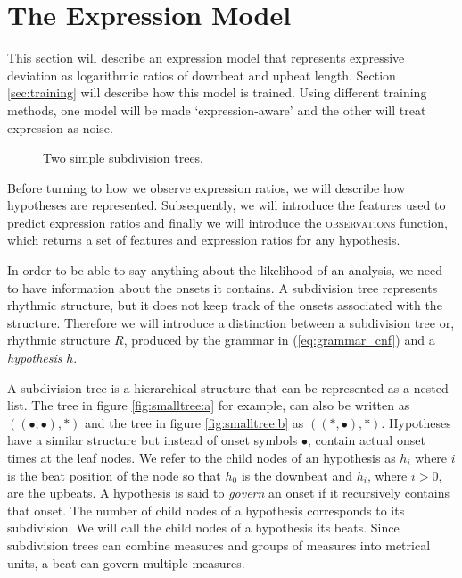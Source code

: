 \section{The Expression Model}
\label{sec:likelihood}

This section will describe an expression model that represents expressive deviation as logarithmic ratios of downbeat and upbeat length. Section \ref{sec:training} will describe how this model is trained. Using different training methods, one model will be made `expression-aware' and the other will treat expression as noise.


\begin{figure}
\centering
{}
\caption{Two simple subdivision trees.}
\label{fig:smalltree}
\end{figure}

Before turning to how we observe expression ratios, we will describe how hypotheses are represented. Subsequently, we will introduce the features used to predict expression ratios and finally we will introduce the \textsc{observations} function, which returns a set of features and expression ratios for any hypothesis.

In order to be able to say anything about the likelihood of an analysis, we need to have information about the onsets it contains. A subdivision tree represents rhythmic structure, but it does not keep track of the onsets associated with the structure. Therefore we will introduce a distinction between a subdivision tree or, rhythmic structure $R$, produced by the grammar in (\ref{eq:grammar_cnf}) and a \textit{hypothesis} $h$.

A subdivision tree is a hierarchical structure that can be represented as a nested list. The tree in figure \ref{fig:smalltree:a} for example, can also be written as $((\bullet, \bullet), *)$ and the tree in figure \ref{fig:smalltree:b} as $((*, \bullet), *)$. Hypotheses have a similar structure but instead of onset symbols $\bullet$, contain actual onset times at the leaf nodes. We refer to the child nodes of an hypothesis as $h_i$ where $i$ is the beat position of the node so that $h_0$ is the downbeat and $h_i$, where $i>0$, are the upbeats. A hypothesis is said to \textit{govern} an onset if it recursively contains that onset. The number of child nodes of a hypothesis corresponds to its subdivision. We will call the child nodes of a hypothesis its beats. Since subdivision trees can combine measures and groups of measures into metrical units, a beat can govern multiple measures.

